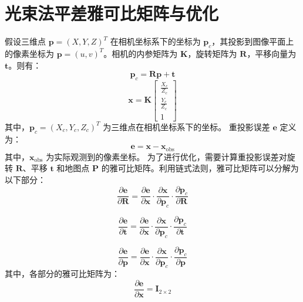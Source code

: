 \section{光束法平差雅可比矩阵与优化}
\label{appendix:bundle_adjustment}
假设三维点 \( \mathbf{p} = (X, Y, Z)^T \) 在相机坐标系下的坐标为 \( \mathbf{p}_c \)，其投影到图像平面上的像素坐标为 \( \mathbf{p} = (u, v)^T \)。相机的内参矩阵为 \( \mathbf{K} \)，旋转矩阵为 \( \mathbf{R} \)，平移向量为 \( \mathbf{t} \)。则有：
\begin{equation}
\mathbf{p}_c = \mathbf{R} \mathbf{p} + \mathbf{t}
\end{equation}
\begin{equation}
\mathbf{x} = \mathbf{K} \begin{bmatrix}
\frac{X_c}{Z_c} \\
\frac{Y_c}{Z_c} \\
1
\end{bmatrix}
\end{equation}
其中，\( \mathbf{p}_c = (X_c, Y_c, Z_c)^T \) 为三维点在相机坐标系下的坐标。
重投影误差 \( \mathbf{e} \) 定义为：
\begin{equation}
\mathbf{e} = \mathbf{x} - \mathbf{x}_{\text{obs}}
\end{equation}
其中，\( \mathbf{x}_{\text{obs}} \) 为实际观测到的像素坐标。
为了进行优化，需要计算重投影误差对旋转 \( \mathbf{R} \)、平移 \( \mathbf{t} \) 和地图点 \( \mathbf{P} \) 的雅可比矩阵。利用链式法则，雅可比矩阵可以分解为以下部分：
\begin{equation}
\frac{\partial \mathbf{e}}{\partial \mathbf{R}} = \frac{\partial \mathbf{e}}{\partial \mathbf{x}} \cdot \frac{\partial \mathbf{x}}{\partial \mathbf{p}_c} \cdot \frac{\partial \mathbf{p}_c}{\partial \mathbf{R}}
\end{equation}

\begin{equation}
\frac{\partial \mathbf{e}}{\partial \mathbf{t}} = \frac{\partial \mathbf{e}}{\partial \mathbf{x}} \cdot \frac{\partial \mathbf{x}}{\partial \mathbf{p}_c} \cdot \frac{\partial \mathbf{p}_c}{\partial \mathbf{t}}
\end{equation}

\begin{equation}
\frac{\partial \mathbf{e}}{\partial \mathbf{p}} = \frac{\partial \mathbf{e}}{\partial \mathbf{x}} \cdot \frac{\partial \mathbf{x}}{\partial \mathbf{p}_c} \cdot \frac{\partial \mathbf{p}_c}{\partial \mathbf{p}}
\end{equation}
其中，各部分的雅可比矩阵为：
\begin{equation}
\frac{\partial \mathbf{e}}{\partial \mathbf{x}} = \mathbf{I}_{2 \times 2}
\end{equation}

